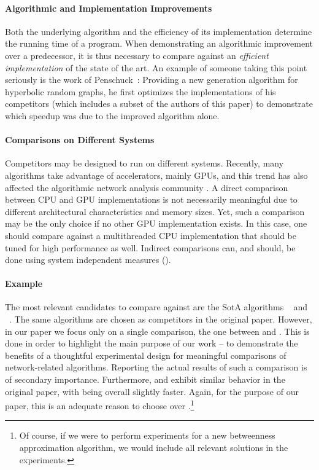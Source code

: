\documentclass[algorithms,article,submit,moreauthors,pdftex]{Definitions/mdpi}
\newcommand{\changed}[1]{#1}
\begin{document}
\paragraph{Algorithmic and Implementation Improvements}
\changed{Both the underlying algorithm and the efficiency of its implementation determine the running time of a program.
When demonstrating an algorithmic improvement over a predecessor, it is thus necessary to compare against an \emph{efficient implementation} of the state of the art.
An example of someone taking this point seriously is the work of Penschuck~\cite{penschuck2017generating}:
Providing a new generation algorithm for hyperbolic random graphs,
 he first optimizes the implementations of his competitors (which includes a subset of the authors of this paper) to demonstrate which speedup was due to the improved algorithm alone.
}

\paragraph{Comparisons on Different Systems}
%
Competitors may be designed to run on different systems.
Recently, many algorithms take advantage of accelerators,
mainly GPUs, and this trend has also affected the algorithmic network analysis community
\cite{mclaugh14, Sariyuce2013, Shi2011}.
A direct comparison between CPU and GPU implementations is not necessarily meaningful
due to different architectural characteristics and memory sizes.
Yet, such a comparison may be the only choice if no other GPU implementation exists.
In this case, one should compare against a multithreaded CPU implementation that
should be tuned for high performance as well.
%
Indirect comparisons can, and should, be done using system independent
measures ().

\paragraph{\kad Example}
The most relevant candidates to compare against
\kad are the SotA algorithms \rk~\cite{riondato2016fast} and ~\cite{riondato2018abra}.
The same algorithms are chosen as competitors in the original \kad paper. However, in our paper
we focus only on a single comparison, the one between \kad and \rk. This is \changed{done} in order
to highlight the main purpose of our work -- to demonstrate the benefits of a thoughtful
experimental design for meaningful comparisons of network-related algorithms.
Reporting the actual results of such a comparison is of secondary importance.
Furthermore, \rk and  exhibit similar behavior in the original \kad paper,
with \rk being overall slightly faster. Again, for the purpose of our paper, this is
an adequate reason to choose \rk over .\footnote{Of course, if we
  were to perform experiments for a new betweenness approximation algorithm,
  we would include all relevant solutions in the experiments.}
\end{document}

